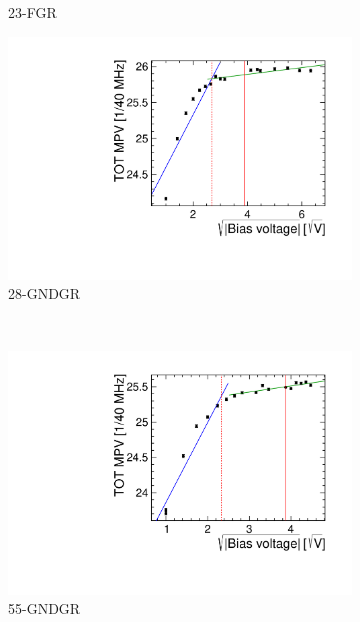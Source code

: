 \begin{figure}[htbp]
\begin{subfigure}[b]{0.33\textwidth}
    \caption{23-FGR}
  \end{subfigure}\hfill
  \begin{subfigure}[b]{0.33\textwidth}
    \includegraphics[width=\textwidth]{./figures/TestBeam/depletionVoltage_W0019_L08.pdf}
    \caption{28-GNDGR}
  \end{subfigure} \\

  \begin{subfigure}[b]{0.33\textwidth}
    \includegraphics[width=\textwidth]{./figures/TestBeam/depletionVoltage_W0019_C07.pdf}
    \caption{55-GNDGR}
  \end{subfigure} \hfill
  \begin{subfigure}[b]{0.33\textwidth}


\end{subfigure}
\end{figure}
